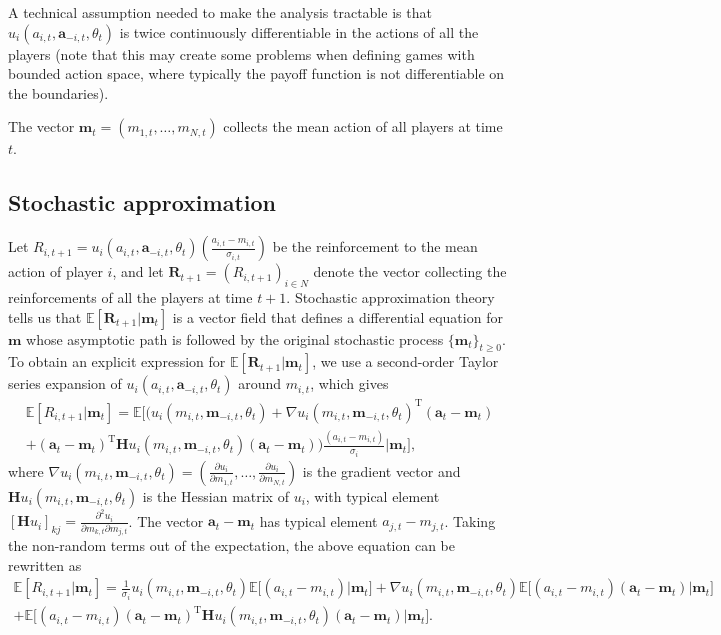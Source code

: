 \documentclass[11pt,reqno]{amsart}
\newcommand{\e}{\theta} %
\newcommand{\ac}{a} %
\newcommand{\va}{\mathbf{a}} %
\newcommand{\Esp}{\mathds{E}} %
\newcommand{\np}{N}%
\newcommand{\tm}{t}%
\newcommand{\pf}{u} %
\newcommand{\ma}{m} %
\newcommand{\sd}{\sigma} %
\newcommand{\vma}{\boldsymbol{\ma}} %
\newcommand{\rf}{R} %
\newcommand{\vrf}{\mathbf{\rf}} %
\newcommand{\pd}{\partial}
\newcommand{\Hs}{\mathbf{H}} %
\begin{document}
A technical assumption needed to make the analysis tractable is that $\pf_{i}(\ac_{i,\tm},\va_{-i,\tm},\e_\tm)$ is twice continuously differentiable in the actions of all the players (note that this may create some problems when defining games with bounded action space, where typically the payoff function is not differentiable on the boundaries).

The vector $\vma_\tm = (\ma_{1,\tm},\dots,\ma_{\np,\tm})$ collects the mean action of all players at time $\tm$.


\subsection{Stochastic approximation}

Let $\rf_{i,t+1} = \pf_{i}(\ac_{i,\tm},\va_{-i,\tm},\e_\tm) \left( \frac{\ac_{i,\tm}- \ma_{i,\tm}}{\sd_{i,\tm}} \right)$ be the reinforcement to the mean action of player $i$, and let $\vrf_{\tm+1} = (\rf_{i,\tm+1})_{i\in\np}$ denote the vector collecting the reinforcements of all the players at time $\tm+1$. Stochastic approximation theory tells us that $\Esp[\vrf_{t+1} | \vma_\tm]$ is a vector field that defines a differential equation for $\vma$ whose asymptotic path is followed by the original stochastic process $\{ \vma_\tm \}_{t\geq 0}$. To obtain an explicit expression for $\Esp[\vrf_{t+1} | \vma_\tm]$, we use a second-order Taylor series expansion of $\pf_{i}(\ac_{i,\tm},\va_{-i,\tm},\e_\tm)$ around $\ma_{i,\tm}$, which gives
\begin{multline}
\label{RfExp}
\Esp[\rf_{i,t+1} | \vma_\tm] =  \Esp \Big[ \Big(\pf_{i}(\ma_{i,\tm},\vma_{-i,\tm},\e_\tm) + \nabla \pf_{i}(\ma_{i,\tm},\vma_{-i,\tm},\e_\tm)^{\textrm{T}} (\va_\tm  - \vma_\tm) \\
 + (\va_\tm  - \vma_\tm)^{\textrm{T}} \Hs \pf_{i}(\ma_{i,\tm},\vma_{-i,\tm},\e_\tm) (\va_\tm  - \vma_\tm) \Big) \frac{(\ac_{i,\tm}- \ma_{i,\tm})}{\sd_{i}} \Big| \vma_\tm \Big],
\end{multline}
where $\nabla \pf_{i}(\ma_{i,\tm},\vma_{-i,\tm},\e_\tm) = \left(\frac{\pd \pf_{i}}{\pd \ma_{1,\tm}},\dots,\frac{\pd \pf_{i}}{\pd \ma_{\np,\tm}}\right)$ is the gradient vector and $\Hs \pf_{i}(\ma_{i,\tm},\vma_{-i,\tm},\e_\tm)$ is the Hessian matrix of $\pf_{i}$, with typical element $[\Hs \pf_{i}]_{kj} = \frac{\pd^2 \pf_{i}}{\pd \ma_{k,\tm} \pd \ma_{j,\tm}}$. The vector $\va_\tm  - \vma_\tm$ has typical element $\ac_{j,\tm}- \ma_{j,\tm}$. Taking the non-random terms out of the expectation, the above equation can be rewritten as
\begin{multline}
\label{RfExp2}
\Esp[\rf_{i,t+1} | \vma_\tm] = \frac{1}{\sd_{i}} \pf_{i}(\ma_{i,\tm},\vma_{-i,\tm},\e_\tm) \Esp \Big[ (\ac_{i,\tm}- \ma_{i,\tm}) \Big| \vma_\tm \Big] + \nabla \pf_{i}(\ma_{i,\tm},\vma_{-i,\tm},\e_\tm) \Esp \Big[ (\ac_{i,\tm}- \ma_{i,\tm}) (\va_\tm  - \vma_\tm) \Big| \vma_\tm \Big] \\
+ \Esp \Big[ (\ac_{i,\tm}- \ma_{i,\tm}) (\va_\tm  - \vma_\tm)^{\textrm{T}} \Hs \pf_{i}(\ma_{i,\tm},\vma_{-i,\tm},\e_\tm) (\va_\tm  - \vma_\tm) \Big| \vma_\tm \Big].
\end{multline}
\end{document}
